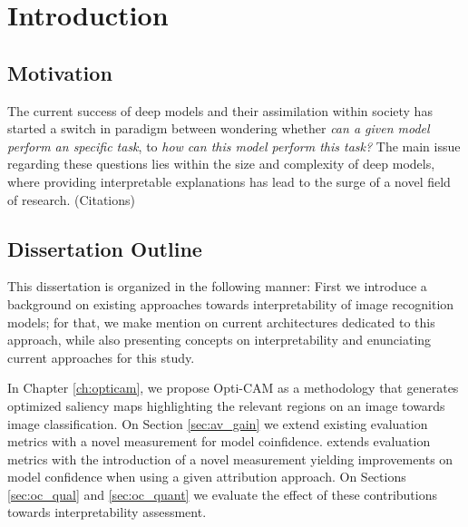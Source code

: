 \chapter*{Introduction}
\chaptertoc{}
\section*{Motivation}
\noindent The current success of deep models and their assimilation within society has started a 
switch in paradigm between wondering whether \textit{can a given model perform an specific task}, 
to \textit{how can this model perform this task?} The main issue regarding these questions lies 
within the size and complexity of deep models, where providing interpretable explanations has lead
 to the surge of a novel field of research. (Citations)


\section*{Dissertation Outline}
\noindent This dissertation is organized in the following manner: First we introduce a background 
on existing approaches towards interpretability of image recognition models; for that, we make 
mention on  current architectures dedicated to this approach, while also presenting concepts on 
interpretability and enunciating current approaches for this study. 

\noindent In Chapter \ref{ch:opticam}, we propose Opti-CAM as a methodology that generates 
optimized saliency maps highlighting the relevant regions on an image towards image classification. 
On Section \ref{sec:av_gain} we extend existing evaluation metrics with a novel measurement for 
model coinfidence. extends evaluation metrics with the introduction of a novel measurement yielding
 improvements on model confidence when using a given attribution approach. 
On Sections \ref{sec:oc_qual} and \ref{sec:oc_quant} we evaluate the effect of these contributions 
towards interpretability assessment.

